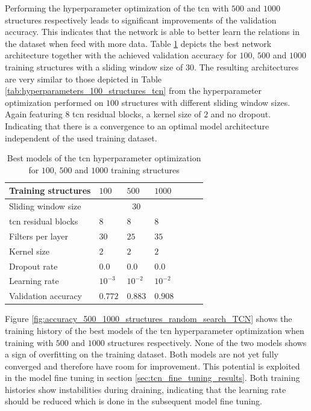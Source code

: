 \documentclass[conference]{IEEEtran}
\begin{document}
Performing the hyperparameter optimization of the \gls{tcn} with $ 500 $ and $ 1000 $ structures respectively leads to significant improvements of the validation accuracy. This indicates that the network is able to better learn the relations in the dataset when feed with more data. Table \ref{tab:hyperparameters_100_500_1000_structures_TCN} depicts the best network architecture together with the achieved validation accuracy for $ 100 $, $ 500 $ and $ 1000 $ training structures with a sliding window size of $ 30 $. The resulting architectures are very similar to those depicted in Table \ref{tab:hyperparameters_100_structures_tcn} from the hyperparameter optimization performed on $ 100 $ structures with different sliding window sizes. Again featuring $ 8 $ \gls{tcn} residual blocks, a kernel size of $ 2 $ and no dropout. Indicating that there is a convergence to an optimal model architecture independent of the used training dataset.

\begin{table}[htp]
	\centering
	\caption{Best models of the \gls{tcn} hyperparameter optimization for $ 100 $, $ 500 $ and $ 1000 $ training structures}
	\label{tab:hyperparameters_100_500_1000_structures_TCN}
	\begin{tabular}{l|llllll}
		Training structures & $ 100 $ & $ 500 $ & $ 1000 $ \\
		\hline
		Sliding window size & \multicolumn{3}{c}{$ 30 $} \\
		\hline
		\gls{tcn} residual blocks & $ 8 $ & $ 8 $ & $ 8 $ \\
		Filters per layer & $ 30 $ & $ 25 $ & $ 35 $ \\
		Kernel size & $ 2 $ & $ 2 $ & $ 2 $ \\
		Dropout rate & $ 0.0 $ & $ 0.0 $ & $ 0.0 $ \\
		Learning rate & $ 10^{-3} $ & $ 10^{-2} $ & $ 10^{-2} $ \\
		\hline
		Validation accuracy & $ 0.772 $ & $ 0.883 $ & $ 0.908 $
	\end{tabular}
\end{table}

Figure \ref{fig:accuracy_500_1000_structures_random_search_TCN} shows the training history of the best models of the \gls{tcn} hyperparameter optimization when training with $ 500 $ and $ 1000 $ structures respectively. None of the two models shows a sign of overfitting on the training dataset. Both models are not yet fully converged and therefore have room for improvement. This potential is exploited in the model fine tuning in section \ref{sec:tcn_fine_tuning_results}. Both training histories show instabilities during draining, indicating that the learning rate should be reduced which is done in the subsequent model fine tuning.
\end{document}
